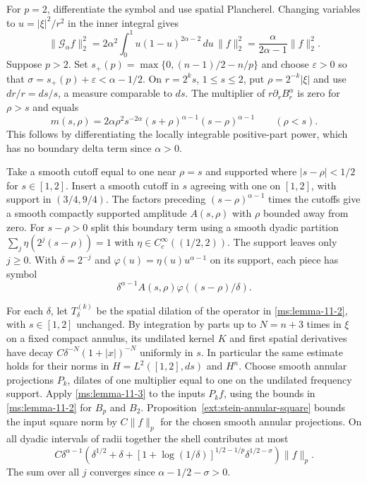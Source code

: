 For $p=2$, differentiate the symbol and use spatial Plancherel. Changing variables to $u=|\xi|^2/r^2$ in the inner integral gives
\[
\|\mathcal G_\alpha f\|_2^2=
2\alpha^2\int_0^1u(1-u)^{2\alpha-2}\,du\,\|f\|_2^2
=\frac{\alpha}{2\alpha-1}\|f\|_2^2.
\]
Suppose $p>2$. Set $s_+(p)=\max\{0,(n-1)/2-n/p\}$ and choose $\varepsilon>0$ so that $\sigma=s_+(p)+\varepsilon<\alpha-1/2$. On $r=2^k s$, $1\le s\le2$, put $\rho=2^{-k}|\xi|$ and use $dr/r=ds/s$, a measure comparable to $ds$. The multiplier of $r\partial_r B_r^\alpha$ is zero for $\rho>s$ and equals
\[
 m(s,\rho)=2\alpha \rho^2s^{-2\alpha}(s+\rho)^{\alpha-1}(s-\rho)^{\alpha-1}
 \qquad (\rho<s).
\]
This follows by differentiating the locally integrable positive-part power, which has no boundary delta term since $\alpha>0$.

Take a smooth cutoff equal to one near $\rho=s$ and supported where $|s-\rho|<1/2$ for $s\in[1,2]$. Insert a smooth cutoff in $s$ agreeing with one on $[1,2]$, with support in $(3/4,9/4)$. The factors preceding $(s-\rho)^{\alpha-1}$ times the cutoffs give a smooth compactly supported amplitude $A(s,\rho)$ with $\rho$ bounded away from zero. For $s-\rho>0$ split this boundary term using a smooth dyadic partition $\sum_j\eta(2^j(s-\rho))=1$ with $\eta\in C_c^\infty((1/2,2))$. The support leaves only $j\ge0$. With $\delta=2^{-j}$ and $\varphi(u)=\eta(u)u^{\alpha-1}$ on its support, each piece has symbol
\[
 \delta^{\alpha-1} A(s,\rho)\varphi((s-\rho)/\delta).
\]

For each $\delta$, let $T_\delta^{(k)}$ be the spatial dilation of the operator in \ref{ms:lemma-11-2}, with $s\in[1,2]$ unchanged. By integration by parts up to $N=n+3$ times in $\xi$ on a fixed compact annulus, its undilated kernel $K$ and first spatial derivatives have decay $C\delta^{-N}(1+|x|)^{-N}$ uniformly in $s$. In particular the same estimate holds for their norms in $H=L^2([1,2],ds)$ and $H^n$. Choose smooth annular projections $P_k$, dilates of one multiplier equal to one on the undilated frequency support. Apply \ref{ms:lemma-11-3} to the inputs $P_kf$, using the bounds in \ref{ms:lemma-11-2} for $B_p$ and $B_2$. Proposition~\ref{ext:stein-annular-square} bounds the input square norm by $C\|f\|_p$ for the chosen smooth annular projections. On all dyadic intervals of radii together the shell contributes at most
\[
 C\delta^{\alpha-1}
 \left(\delta^{1/2}+\delta+
 [1+\log(1/\delta)]^{1/2-1/p}\delta^{1/2-\sigma}\right)\|f\|_p.
\]
The sum over all $j$ converges since $\alpha-1/2-\sigma>0$.

